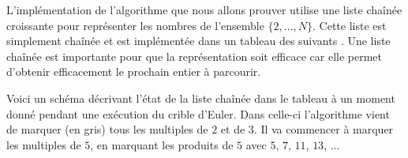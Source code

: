 \documentclass[a4paper]{easychair}
\newcommand\arr[1]{\ocamlf{arr[}#1\ocamlf{]}}
\begin{document}
L'implémentation de l'algorithme que nous allons prouver utilise une liste
chaînée croissante pour représenter les nombres de l'ensemble $\{2,...,N\}$.
Cette liste est simplement chaînée et est implémentée dans un tableau
des suivants .
Une liste chaînée est importante pour que la représentation soit efficace
car elle permet d'obtenir efficacement le prochain entier à parcourir.

Voici un schéma décrivant l'état de la liste chaînée dans le tableau
 à un moment donné pendant une exécution du crible d'Euler.
Dans celle-ci l'algorithme vient de marquer (en gris) tous les multiples
de $2$ et de $3$.
Il va commencer à marquer les multiples de $5$, en marquant les produits
de $5$ avec $5$, $7$, $11$, $13$, ...

\end{document}
